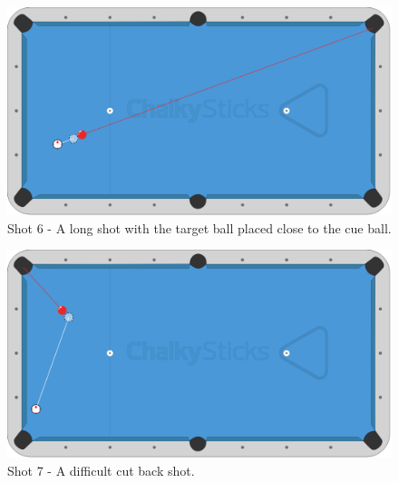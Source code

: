 \documentclass[ %
                author={Finn Alexander Wilkinson},
                supervisor={Dr. Andrew Calway},
                degree={MEng},
                title={\centering A Mixed Reality Aim Assistant for Pool and Snooker},
                subtitle={},
                type={Enterprise},
                year={2021} ]{dissertation}
\begin{document}
\begin{figure}[h]
    \centering
    \includegraphics[scale = 0.2]{Images/Shot Diagrams/Shot_6.png}
    \caption{Shot 6 - A long shot with the target ball placed close to the cue ball.}
    \label{fig:shot6}
\end{figure}

\begin{figure}[h]
    \centering
    \includegraphics[scale = 0.2]{Images/Shot Diagrams/Shot_7.png}
    \caption{Shot 7 - A difficult cut back shot.}
    \label{fig:shot7}
\end{figure}


\end{document}
